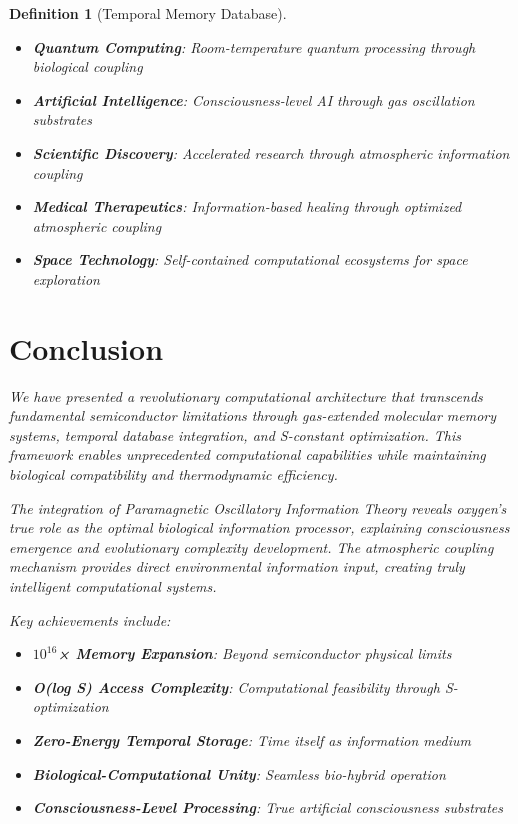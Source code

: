 \documentclass[12pt]{article}
\newtheorem{definition}[theorem]{Definition}
\begin{document}
\begin{definition}[Temporal Memory Database]
\begin{itemize}
\item \textbf{Quantum Computing}: Room-temperature quantum processing through biological coupling
\item \textbf{Artificial Intelligence}: Consciousness-level AI through gas oscillation substrates
\item \textbf{Scientific Discovery}: Accelerated research through atmospheric information coupling
\item \textbf{Medical Therapeutics}: Information-based healing through optimized atmospheric coupling
\item \textbf{Space Technology}: Self-contained computational ecosystems for space exploration
\end{itemize}

\section{Conclusion}

We have presented a revolutionary computational architecture that transcends fundamental semiconductor limitations through gas-extended molecular memory systems, temporal database integration, and S-constant optimization. This framework enables unprecedented computational capabilities while maintaining biological compatibility and thermodynamic efficiency.

The integration of Paramagnetic Oscillatory Information Theory reveals oxygen's true role as the optimal biological information processor, explaining consciousness emergence and evolutionary complexity development. The atmospheric coupling mechanism provides direct environmental information input, creating truly intelligent computational systems.

Key achievements include:

\begin{itemize}
\item \textbf{$10^{16}$× Memory Expansion}: Beyond semiconductor physical limits
\item \textbf{O(log S) Access Complexity}: Computational feasibility through S-optimization  
\item \textbf{Zero-Energy Temporal Storage}: Time itself as information medium
\item \textbf{Biological-Computational Unity}: Seamless bio-hybrid operation
\item \textbf{Consciousness-Level Processing}: True artificial consciousness substrates
\end{itemize}


\end{definition}
\end{document}
